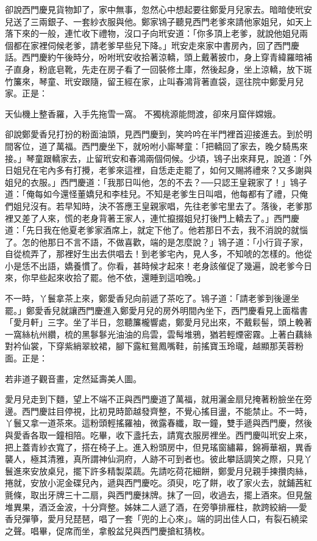 卻說西門慶見貨物卸了，家中無事，忽然心中想起要往鄭愛月兒家去。暗暗使玳安兒送了三兩銀子、一套紗衣服與他。鄭家鴇子聽見西門老爹來請他家姐兒，如天上落下來的一般，連忙收下禮物，沒口子向玳安道：「你多頂上老爹，就說他姐兒兩個都在家裡伺候老爹，請老爹早些兒下降。」玳安走來家中書房內，回了西門慶話。西門慶約午後時分，吩咐玳安收拾著涼轎，頭上戴著披巾，身上穿青緯羅暗補子直身，粉底皂靴，先走在房子看了一回裝修土庫，然後起身，坐上涼轎，放下斑竹簾來，琴童、玳安跟隨，留王經在家，止叫春鴻背著直袋，逕往院中鄭愛月兒家。正是：

天仙機上整香羅，入手先拖雪一窩。
不獨桃源能問渡，卻來月窟伴嫦娥。

卻說鄭愛香兒打扮的粉面油頭，見西門慶到，笑吟吟在半門裡首迎接進去。到於明間客位，道了萬福。西門慶坐下，就吩咐小廝琴童：「把轎回了家去，晚夕騎馬來接。」琴童跟轎家去，止留玳安和春鴻兩個伺候。少頃，鴇子出來拜見，說道：「外日姐兒在宅內多有打攪，老爹來這裡，自恁走走罷了，如何又賜將禮來？又多謝與姐兒的衣服。」西門慶道：「我那日叫他，怎的不去？──只認王皇親家了！」鴇子道：「俺每如今還怪董嬌兒和李桂兒。不知是老爹生日叫唱，他每都有了禮，只俺們姐兒沒有。若早知時，決不答應王皇親家唱，先往老爹宅里去了。落後，老爹那裡又差了人來，慌的老身背著王家人，連忙攛掇姐兒打後門上轎去了。」西門慶道：「先日我在他夏老爹家酒席上，就定下他了。他若那日不去，我不消說的就惱了。怎的他那日不言不語，不做喜歡，端的是怎麼說？」鴇子道：「小行貨子家，自從梳弄了，那裡好生出去供唱去！到老爹宅內，見人多，不知唬的怎樣的。他從小是恁不出語，嬌養慣了。你看，甚時候才起來！老身該催促了幾遍，說老爹今日來，你早些起來收拾了罷。他不依，還睡到這咱晚。」

不一時，丫鬟拿茶上來，鄭愛香兒向前遞了茶吃了。鴇子道：「請老爹到後邊坐罷。」鄭愛香兒就讓西門慶進入鄭愛月兒的房外明間內坐下，西門慶看見上面楷書 「愛月軒」三字。坐了半日，忽聽簾櫳響處，鄭愛月兒出來，不戴鬏髻，頭上輓著一窩絲杭州纘，梳的黑鬖鬖光油油的烏雲，雲髩堆鴉，猶若輕煙密霧。上著白藕絲對衿仙裳，下穿紫綃翠紋裙，腳下露紅鴛鳳嘴鞋，前搖寶玉玲瓏，越顯那芙蓉粉面。正是：

若非道子觀音畫，定然延壽美人圖。

愛月兒走到下麵，望上不端不正與西門慶道了萬福，就用灑金扇兒掩著粉臉坐在旁邊。西門慶註目停視，比初見時節越發齊整，不覺心搖目盪，不能禁止。不一時，丫鬟又拿一道茶來。這粉頭輕搖羅袖，微露春纖，取一鐘，雙手遞與西門慶，然後與愛香各取一鐘相陪。吃畢，收下盞托去，請寬衣服房裡坐。西門慶叫玳安上來，把上蓋青紗衣寬了，搭在椅子上。進入粉頭房中，但見瑤窗繡幕，錦褥華裀，異香襲人，極其清雅，真所謂神仙洞府，人跡不可到者也。彼此攀話調笑之際，只見丫鬟進來安放桌兒，擺下許多精製菜蔬。先請吃荷花細餅，鄭愛月兒親手揀攢肉絲，捲就，安放小泥金碟兒內，遞與西門慶吃。須臾，吃了餅，收了家火去，就鋪茜紅氈條，取出牙牌三十二扇，與西門慶抹牌。抹了一回，收過去，擺上酒來。但見盤堆異果，酒泛金波，十分齊整。姊妹二人遞了酒，在旁箏排雁柱，款跨絞綃──愛香兒彈箏，愛月兒琵琶，唱了一套「兜的上心來」。端的詞出佳人口，有裂石繞梁之聲。唱畢，促席而坐，拿骰盆兒與西門慶搶紅猜枚。


